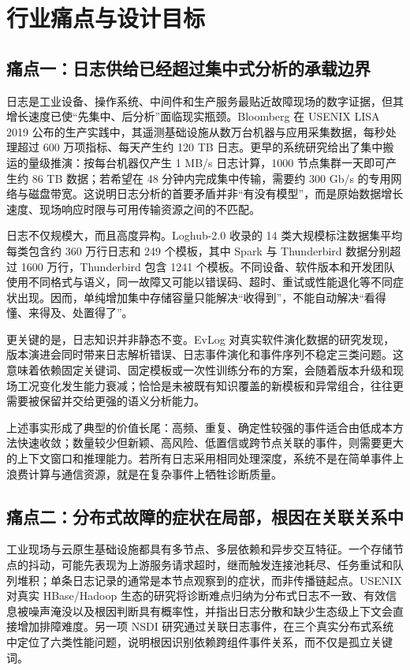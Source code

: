\chapter{行业痛点与设计目标}

\section{痛点一：日志供给已经超过集中式分析的承载边界}

日志是工业设备、操作系统、中间件和生产服务最贴近故障现场的数字证据，但其增长速度已使“先集中、后分析”面临现实瓶颈。Bloomberg 在 USENIX LISA 2019 公布的生产实践中，其遥测基础设施从数万台机器与应用采集数据，每秒处理超过 600 万项指标、每天产生约 120 TB 日志\cite{terng2019bloomberg}。更早的系统研究给出了集中搬运的量级推演：按每台机器仅产生 1 MB/s 日志计算，1000 节点集群一天即可产生约 86 TB 数据；若希望在 48 分钟内完成集中传输，需要约 300 Gb/s 的专用网络与磁盘带宽\cite{logothetis2011insitu}。这说明日志分析的首要矛盾并非“有没有模型”，而是原始数据增长速度、现场响应时限与可用传输资源之间的不匹配。

日志不仅规模大，而且高度异构。Loghub-2.0 收录的 14 类大规模标注数据集平均每类包含约 360 万行日志和 249 个模板，其中 Spark 与 Thunderbird 数据分别超过 1600 万行，Thunderbird 包含 1241 个模板\cite{jiang2024loghub2}。不同设备、软件版本和开发团队使用不同格式与语义，同一故障又可能以错误码、超时、重试或性能退化等不同症状出现。因而，单纯增加集中存储容量只能解决“收得到”，不能自动解决“看得懂、来得及、处置得了”。

更关键的是，日志知识并非静态不变。EvLog 对真实软件演化数据的研究发现，版本演进会同时带来日志解析错误、日志事件演化和事件序列不稳定三类问题\cite{huo2023evlog}。这意味着依赖固定关键词、固定模板或一次性训练分布的方案，会随着版本升级和现场工况变化发生能力衰减；恰恰是未被既有知识覆盖的新模板和异常组合，往往更需要被保留并交给更强的语义分析能力。

上述事实形成了典型的价值长尾：高频、重复、确定性较强的事件适合由低成本方法快速收敛；数量较少但新颖、高风险、低置信或跨节点关联的事件，则需要更大的上下文窗口和推理能力。若所有日志采用相同处理深度，系统不是在简单事件上浪费计算与通信资源，就是在复杂事件上牺牲诊断质量。

\section{痛点二：分布式故障的症状在局部，根因在关联关系中}

工业现场与云原生基础设施都具有多节点、多层依赖和异步交互特征。一个存储节点的抖动，可能先表现为上游服务请求超时，继而触发连接池耗尽、任务重试和队列堆积；单条日志记录的通常是本节点观察到的症状，而非传播链起点。USENIX 对真实 HBase/Hadoop 生态的研究将诊断难点归纳为分布式日志不一致、有效信息被噪声淹没以及根因判断具有概率性，并指出日志分散和缺少生态级上下文会直接增加排障难度\cite{li2013hadoopdiagnosis}。另一项 NSDI 研究通过关联日志事件，在三个真实分布式系统中定位了六类性能问题，说明根因识别依赖跨组件事件关系，而不仅是孤立关键词\cite{nagaraj2012distalyzer}。

